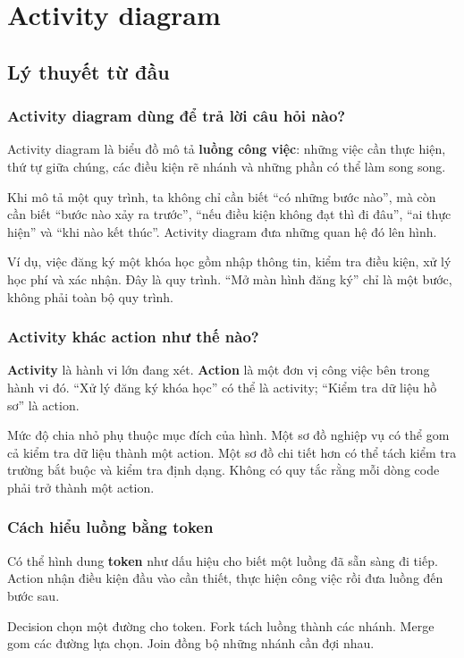 \documentclass[12pt,a4paper]{article}
\newcommand{\chapter}[1]{\clearpage\section{#1}}
\begin{document}
\MakeHCMUTCover
\begingroup{}\small\tableofcontents\endgroup

\chapter{Activity diagram}
\subsection{Lý thuyết từ đầu}
\subsubsection{Activity diagram dùng để trả lời câu hỏi nào?}
Activity diagram là biểu đồ mô tả \textbf{luồng công việc}: những việc cần thực hiện, thứ tự giữa chúng, các điều kiện rẽ nhánh và những phần có thể làm song song.

Khi mô tả một quy trình, ta không chỉ cần biết “có những bước nào”, mà còn cần biết “bước nào xảy ra trước”, “nếu điều kiện không đạt thì đi đâu”, “ai thực hiện” và “khi nào kết thúc”. Activity diagram đưa những quan hệ đó lên hình.

Ví dụ, việc đăng ký một khóa học gồm nhập thông tin, kiểm tra điều kiện, xử lý học phí và xác nhận. Đây là quy trình. “Mở màn hình đăng ký” chỉ là một bước, không phải toàn bộ quy trình.

\subsubsection{Activity khác action như thế nào?}
\textbf{Activity} là hành vi lớn đang xét. \textbf{Action} là một đơn vị công việc bên trong hành vi đó. “Xử lý đăng ký khóa học” có thể là activity; “Kiểm tra dữ liệu hồ sơ” là action.

Mức độ chia nhỏ phụ thuộc mục đích của hình. Một sơ đồ nghiệp vụ có thể gom cả kiểm tra dữ liệu thành một action. Một sơ đồ chi tiết hơn có thể tách kiểm tra trường bắt buộc và kiểm tra định dạng. Không có quy tắc rằng mỗi dòng code phải trở thành một action.

\subsubsection{Cách hiểu luồng bằng token}
Có thể hình dung \textbf{token} như dấu hiệu cho biết một luồng đã sẵn sàng đi tiếp. Action nhận điều kiện đầu vào cần thiết, thực hiện công việc rồi đưa luồng đến bước sau.

Decision chọn một đường cho token. Fork tách luồng thành các nhánh. Merge gom các đường lựa chọn. Join đồng bộ những nhánh cần đợi nhau.
\end{document}

